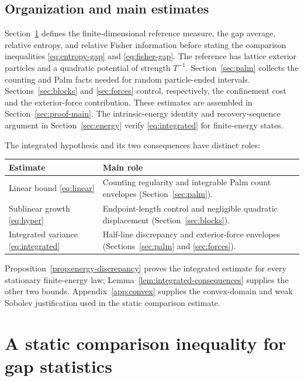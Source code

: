 \documentclass[11pt,reqno]{amsart}
\numberwithin{equation}{section}
\theoremstyle{definition}
\theoremstyle{remark}
\newcommand{\1}{\mathbf 1}
\begin{document}
\subsection{Organization and main estimates}

Section~\ref{sec:entropy} defines the finite-dimensional reference measure,
the gap average, relative entropy, and relative Fisher information before
stating the comparison inequalities \eqref{eq:entropy-gap} and
\eqref{eq:fisher-gap}. The reference has lattice exterior particles and
a quadratic potential of strength $T^{-1}$. Section~\ref{sec:palm} collects the
counting and Palm facts needed for random particle-ended intervals.
Sections~\ref{sec:blocks} and \ref{sec:forces} control, respectively, the
confinement cost and the exterior-force contribution. These estimates
are assembled in Section~\ref{sec:proof-main}. The intrinsic-energy
identity and recovery-sequence argument in Section~\ref{sec:energy}
verify \eqref{eq:integrated} for finite-energy states.


The integrated hypothesis and its two consequences have distinct roles:
\begin{center}
\renewcommand{\arraystretch}{1.2}
\begin{tabular}{@{}p{}p{}@{}}
\hline
Estimate & Main role \\
\hline
Linear bound \eqref{eq:linear}
& Counting regularity and integrable Palm count envelopes
(Section~\ref{sec:palm}). \\
Sublinear growth \eqref{eq:hyper}
& Endpoint-length control and negligible quadratic displacement
(Section~\ref{sec:blocks}). \\
Integrated variance \eqref{eq:integrated}
& Half-line discrepancy and exterior-force envelopes
(Sections~\ref{sec:palm} and \ref{sec:forces}). \\
\hline
\end{tabular}
\end{center}
Proposition~\ref{prop:energy-discrepancy} proves the integrated estimate
for every stationary finite-energy law; Lemma~\ref{lem:integrated-consequences}
supplies the other two bounds. Appendix~\ref{app:convex} supplies
the convex-domain and weak Sobolev justification used in the static
comparison estimate.

\section{A static comparison inequality for gap statistics}
\label{sec:entropy}
\end{document}
